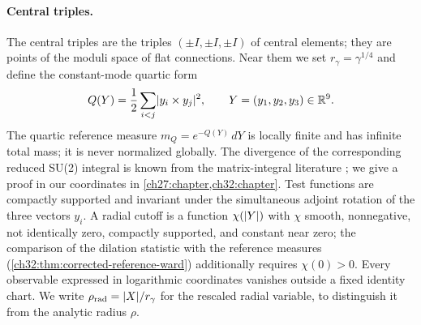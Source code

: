 \paragraph{Central triples.}
The central triples are the triples $(\pm I,\pm I,\pm I)$ of central elements; they are points of the moduli space of flat connections. Near them we set $r_\gamma=\gamma^{1/4}$ and define the constant-mode quartic form
\[
 Q(Y)=\frac12\sum_{i<j}\lvert y_i\times y_j\rvert^2,\qquad Y=(y_1,y_2,y_3)\in\mathbb R^9.
\]
The quartic reference measure $m_Q=e^{-Q(Y)}\,dY$ is locally finite and has infinite total mass; it is never normalized globally. The divergence of the corresponding reduced SU(2) integral is known from the matrix-integral literature \cite{KrauthNicolaiStaudacher1998,AustingWheater2001Convergence}; we give a proof in our coordinates in \cref{ch27:chapter,ch32:chapter}. Test functions are compactly supported and invariant under the simultaneous adjoint rotation of the three vectors $y_i$. A radial cutoff is a function $\chi(\lvert Y\rvert)$ with $\chi$ smooth, nonnegative, not identically zero, compactly supported, and constant near zero; the comparison of the dilation statistic with the reference measures (\cref{ch32:thm:corrected-reference-ward}) additionally requires $\chi(0)>0$. Every observable expressed in logarithmic coordinates vanishes outside a fixed identity chart. We write $\rho_{\mathrm{rad}}=\lvert X\rvert/r_\gamma$ for the rescaled radial variable, to distinguish it from the analytic radius $\rho$.

